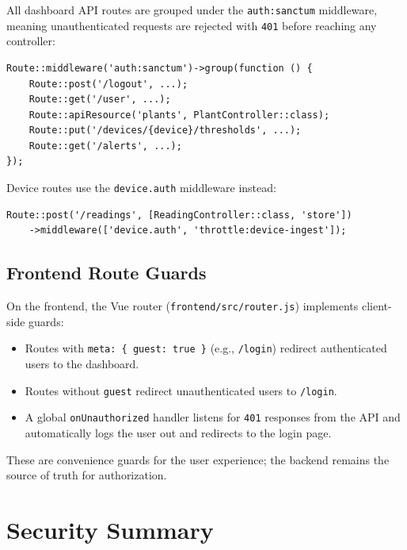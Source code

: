 \documentclass[11pt,a4paper]{article}
\begin{document}
All dashboard API routes are grouped under the \texttt{auth:sanctum} middleware, meaning unauthenticated requests are rejected with \texttt{401} before reaching any controller:

\begin{lstlisting}[caption=Route group with sanctum middleware]
Route::middleware('auth:sanctum')->group(function () {
    Route::post('/logout', ...);
    Route::get('/user', ...);
    Route::apiResource('plants', PlantController::class);
    Route::put('/devices/{device}/thresholds', ...);
    Route::get('/alerts', ...);
});
\end{lstlisting}

Device routes use the \texttt{device.auth} middleware instead:

\begin{lstlisting}[caption=Device route with device.auth middleware]
Route::post('/readings', [ReadingController::class, 'store'])
    ->middleware(['device.auth', 'throttle:device-ingest']);
\end{lstlisting}

\subsection{Frontend Route Guards}

On the frontend, the Vue router (\texttt{frontend/src/router.js}) implements client-side guards:
\begin{itemize}
    \item Routes with \texttt{meta: \{ guest: true \}} (e.g., \texttt{/login}) redirect authenticated users to the dashboard.
    \item Routes without \texttt{guest} redirect unauthenticated users to \texttt{/login}.
    \item A global \texttt{onUnauthorized} handler listens for \texttt{401} responses from the API and automatically logs the user out and redirects to the login page.
\end{itemize}

These are convenience guards for the user experience; the backend remains the source of truth for authorization.

\section{Security Summary}
\end{document}

